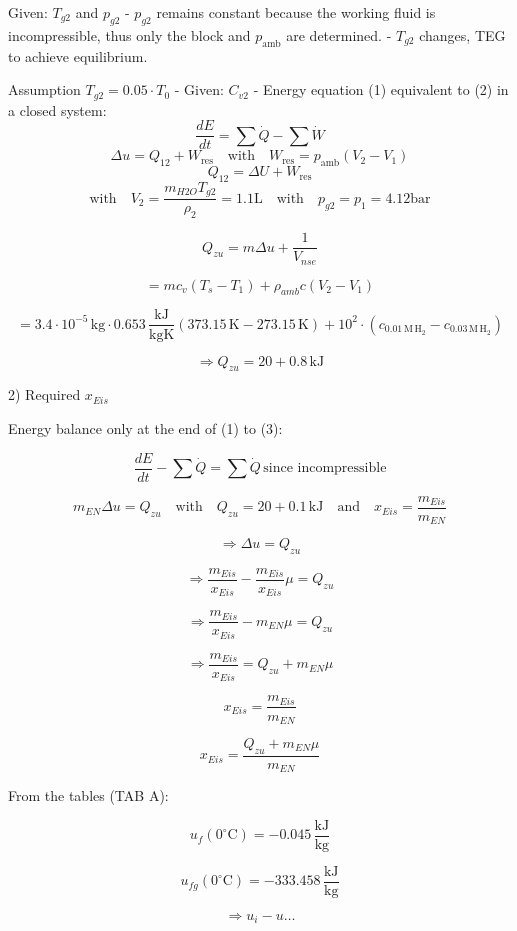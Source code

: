 Given: \( T_{g2} \) and \( p_{g2} \)
- \( p_{g2} \) remains constant because the working fluid is incompressible, thus only the block and \( p_{\text{amb}} \) are determined.
- \( T_{g2} \) changes, TEG to achieve equilibrium.

Assumption \( T_{g2} = 0.05 \cdot T_0 \)
- Given: \( C_{v2} \)
- Energy equation (1) equivalent to (2) in a closed system:
  \[
  \frac{dE}{dt} = \sum \dot{Q} - \sum \dot{W}
  \]
  \[
  \Delta u = Q_{12} + W_{\text{res}} \quad \text{with} \quad W_{\text{res}} = p_{\text{amb}} (V_2 - V_1)
  \]
  \[
  Q_{12} = \Delta U + W_{\text{res}}
  \]
  \[
  \text{with} \quad V_2 = \frac{m_{H2O} T_{g2}}{\rho_2} = 1.1 \text{L} \quad \text{with} \quad p_{g2} = p_1 = 4.12 \text{bar}
  \]

\[
Q_{zu} = m \Delta u + \frac{1}{V_{nse}}
\]

\[
= m c_v (T_s - T_1) + \rho_{amb} c (V_2 - V_1)
\]

\[
= 3.4 \cdot 10^{-5} \, \text{kg} \cdot 0.653 \, \frac{\text{kJ}}{\text{kgK}} \left( 373.15 \, \text{K} - 273.15 \, \text{K} \right) + 10^2 \cdot \left( c_{0.01 \, \text{M} \, \text{H}_2} - c_{0.03 \, \text{M} \, \text{H}_2} \right)
\]

\[
\Rightarrow Q_{zu} = 20 + 0.8 \, \text{kJ}
\]

2) Required \( x_{Eis} \)

Energy balance only at the end of (1) to (3):

\[
\frac{dE}{dt} - \sum \dot{Q} = \sum \dot{Q} \, \text{since incompressible}
\]

\[
m_{EN} \Delta u = Q_{zu} \quad \text{with} \quad Q_{zu} = 20 + 0.1 \, \text{kJ} \quad \text{and} \quad x_{Eis} = \frac{m_{Eis}}{m_{EN}}
\]

\[
\Rightarrow \Delta u = Q_{zu}
\]

\[
\Rightarrow \frac{m_{Eis}}{x_{Eis}} - \frac{m_{Eis}}{x_{Eis}} \mu = Q_{zu}
\]

\[
\Rightarrow \frac{m_{Eis}}{x_{Eis}} - m_{EN} \mu = Q_{zu}
\]

\[
\Rightarrow \frac{m_{Eis}}{x_{Eis}} = Q_{zu} + m_{EN} \mu
\]

\[
x_{Eis} = \frac{m_{Eis}}{m_{EN}}
\]

\[
x_{Eis} = \frac{Q_{zu} + m_{EN} \mu}{m_{EN}}
\]

From the tables (TAB A):

\[
u_f (0^\circ \text{C}) = -0.045 \, \frac{\text{kJ}}{\text{kg}}
\]

\[
u_{fg} (0^\circ \text{C}) = -333.458 \, \frac{\text{kJ}}{\text{kg}}
\]

\[
\Rightarrow u_i - u \ldots
\]